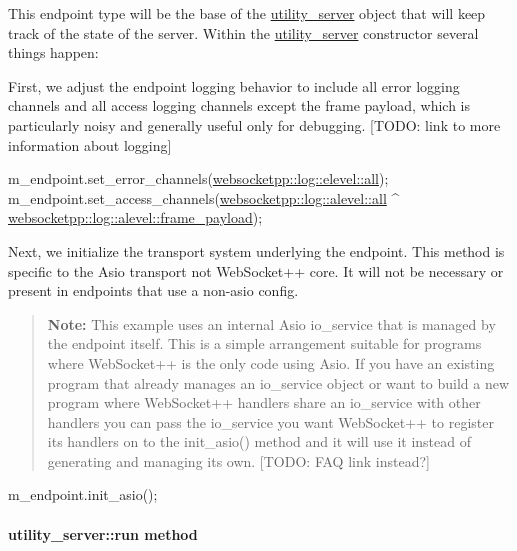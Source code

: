 This endpoint type will be the base of the \mbox{\hyperlink{classutility__server}{utility\+\_\+server}} object that will keep track of the state of the server. Within the {\ttfamily \mbox{\hyperlink{classutility__server}{utility\+\_\+server}}} constructor several things happen\+:

First, we adjust the endpoint logging behavior to include all error logging channels and all access logging channels except the frame payload, which is particularly noisy and generally useful only for debugging. \mbox{[}T\+O\+DO\+: link to more information about logging\mbox{]}


\begin{DoxyCode}
m\_endpoint.set\_error\_channels(\mbox{\hyperlink{structwebsocketpp_1_1log_1_1elevel_a9b31ff708c221d314f9f4eb3ff2b1ad7}{websocketpp::log::elevel::all}});
m\_endpoint.set\_access\_channels(\mbox{\hyperlink{structwebsocketpp_1_1log_1_1alevel_a853aa0b8976e53f3181af3bc398d493e}{websocketpp::log::alevel::all}} ^ 
      \mbox{\hyperlink{structwebsocketpp_1_1log_1_1alevel_aa38cfdf7a82f33cac319438462707e90}{websocketpp::log::alevel::frame\_payload}});
\end{DoxyCode}


Next, we initialize the transport system underlying the endpoint. This method is specific to the Asio transport not Web\+Socket++ core. It will not be necessary or present in endpoints that use a non-\/asio config.

\begin{quote}
{\bfseries Note\+:} This example uses an internal Asio {\ttfamily io\+\_\+service} that is managed by the endpoint itself. This is a simple arrangement suitable for programs where Web\+Socket++ is the only code using Asio. If you have an existing program that already manages an {\ttfamily io\+\_\+service} object or want to build a new program where Web\+Socket++ handlers share an io\+\_\+service with other handlers you can pass the {\ttfamily io\+\_\+service} you want Web\+Socket++ to register its handlers on to the {\ttfamily init\+\_\+asio()} method and it will use it instead of generating and managing its own. \mbox{[}T\+O\+DO\+: F\+AQ link instead?\mbox{]} \end{quote}



\begin{DoxyCode}
m\_endpoint.init\_asio();
\end{DoxyCode}


\paragraph*{{\ttfamily utility\+\_\+server\+::run} method}

